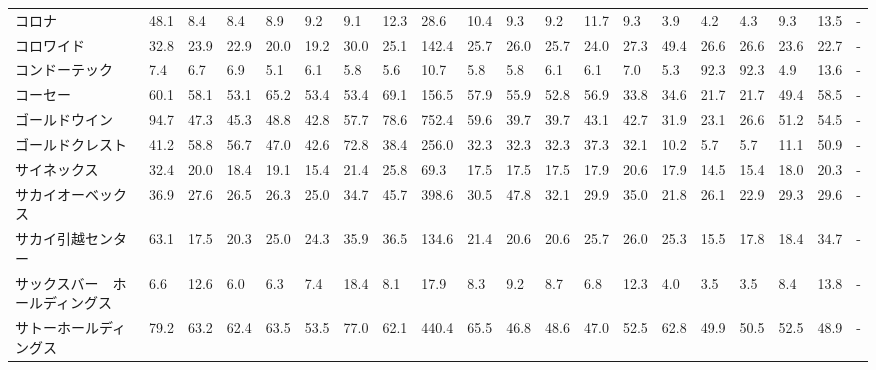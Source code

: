\begin{tabular}{llllllllllllllllllll}
コロナ             &   48.1 &    8.4 &       8.4 &       8.9 &        9.2 &     9.1 &    12.3 &     28.6 &    10.4 &     9.3 &    9.2 &   11.7 &     9.3 &     3.9 &     4.2 &    4.3 &    9.3 &    13.5 &      - \\
コロワイド           &   32.8 &   23.9 &      22.9 &      20.0 &       19.2 &    30.0 &    25.1 &    142.4 &    25.7 &    26.0 &   25.7 &   24.0 &    27.3 &    49.4 &    26.6 &   26.6 &   23.6 &    22.7 &      - \\
コンドーテック         &    7.4 &    6.7 &       6.9 &       5.1 &        6.1 &     5.8 &     5.6 &     10.7 &     5.8 &     5.8 &    6.1 &    6.1 &     7.0 &     5.3 &    92.3 &   92.3 &    4.9 &    13.6 &      - \\
コーセー            &   60.1 &   58.1 &      53.1 &      65.2 &       53.4 &    53.4 &    69.1 &    156.5 &    57.9 &    55.9 &   52.8 &   56.9 &    33.8 &    34.6 &    21.7 &   21.7 &   49.4 &    58.5 &      - \\
ゴールドウイン         &   94.7 &   47.3 &      45.3 &      48.8 &       42.8 &    57.7 &    78.6 &    752.4 &    59.6 &    39.7 &   39.7 &   43.1 &    42.7 &    31.9 &    23.1 &   26.6 &   51.2 &    54.5 &      - \\
ゴールドクレスト        &   41.2 &   58.8 &      56.7 &      47.0 &       42.6 &    72.8 &    38.4 &    256.0 &    32.3 &    32.3 &   32.3 &   37.3 &    32.1 &    10.2 &     5.7 &    5.7 &   11.1 &    50.9 &      - \\
サイネックス          &   32.4 &   20.0 &      18.4 &      19.1 &       15.4 &    21.4 &    25.8 &     69.3 &    17.5 &    17.5 &   17.5 &   17.9 &    20.6 &    17.9 &    14.5 &   15.4 &   18.0 &    20.3 &      - \\
サカイオーベックス       &   36.9 &   27.6 &      26.5 &      26.3 &       25.0 &    34.7 &    45.7 &    398.6 &    30.5 &    47.8 &   32.1 &   29.9 &    35.0 &    21.8 &    26.1 &   22.9 &   29.3 &    29.6 &      - \\
サカイ引越センター       &   63.1 &   17.5 &      20.3 &      25.0 &       24.3 &    35.9 &    36.5 &    134.6 &    21.4 &    20.6 &   20.6 &   25.7 &    26.0 &    25.3 &    15.5 &   17.8 &   18.4 &    34.7 &      - \\
サックスバー　ホールディングス &    6.6 &   12.6 &       6.0 &       6.3 &        7.4 &    18.4 &     8.1 &     17.9 &     8.3 &     9.2 &    8.7 &    6.8 &    12.3 &     4.0 &     3.5 &    3.5 &    8.4 &    13.8 &      - \\
サトーホールディングス     &   79.2 &   63.2 &      62.4 &      63.5 &       53.5 &    77.0 &    62.1 &    440.4 &    65.5 &    46.8 &   48.6 &   47.0 &    52.5 &    62.8 &    49.9 &   50.5 &   52.5 &    48.9 &      - \\

\end{tabular}
